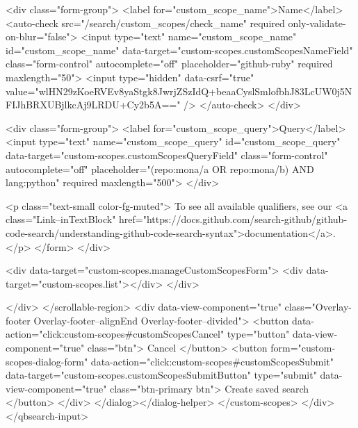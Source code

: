           <div class="form-group">
            <label for="custom_scope_name">Name</label>
            <auto-check src="/search/custom_scopes/check_name" required only-validate-on-blur="false">
              <input
                type="text"
                name="custom_scope_name"
                id="custom_scope_name"
                data-target="custom-scopes.customScopesNameField"
                class="form-control"
                autocomplete="off"
                placeholder="github-ruby"
                required
                maxlength="50">
              <input type="hidden" data-csrf="true" value="wlHN29zKoeRVEv8yaStgk8JwrjZSzIdQ+beaaCyslSmlofbhJ83LcUW0j5NFIJhBRXUBjlkcAj9LRDU+Cy2b5A==" />
            </auto-check>
          </div>

          <div class="form-group">
            <label for="custom_scope_query">Query</label>
            <input
              type="text"
              name="custom_scope_query"
              id="custom_scope_query"
              data-target="custom-scopes.customScopesQueryField"
              class="form-control"
              autocomplete="off"
              placeholder="(repo:mona/a OR repo:mona/b) AND lang:python"
              required
              maxlength="500">
          </div>

          <p class="text-small color-fg-muted">
            To see all available qualifiers, see our <a class="Link--inTextBlock" href="https://docs.github.com/search-github/github-code-search/understanding-github-code-search-syntax">documentation</a>.
          </p>
</form>        </div>

        <div data-target="custom-scopes.manageCustomScopesForm">
          <div data-target="custom-scopes.list"></div>
        </div>

</div>
      </scrollable-region>
      <div data-view-component="true" class="Overlay-footer Overlay-footer--alignEnd Overlay-footer--divided">          <button data-action="click:custom-scopes#customScopesCancel" type="button" data-view-component="true" class="btn">    Cancel
</button>
          <button form="custom-scopes-dialog-form" data-action="click:custom-scopes#customScopesSubmit" data-target="custom-scopes.customScopesSubmitButton" type="submit" data-view-component="true" class="btn-primary btn">    Create saved search
</button>
</div>
</dialog></dialog-helper>
    </custom-scopes>
  </div>
</qbsearch-input>


